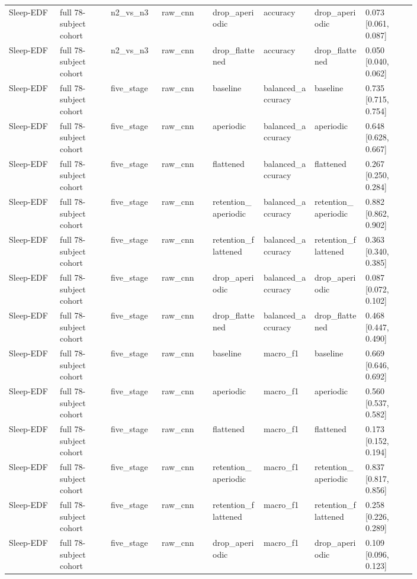 \begin{longtable}{p{0.10\linewidth}p{0.10\linewidth}p{0.10\linewidth}p{0.10\linewidth}p{0.10\linewidth}p{0.10\linewidth}p{0.10\linewidth}p{0.10\linewidth}}
Sleep-EDF & full 78-subject cohort & n2\_vs\_n3 & raw\_cnn & drop\_aperiodic & accuracy & drop\_aperiodic & 0.073 [0.061, 0.087]\\
Sleep-EDF & full 78-subject cohort & n2\_vs\_n3 & raw\_cnn & drop\_flattened & accuracy & drop\_flattened & 0.050 [0.040, 0.062]\\
Sleep-EDF & full 78-subject cohort & five\_stage & raw\_cnn & baseline & balanced\_accuracy & baseline & 0.735 [0.715, 0.754]\\
Sleep-EDF & full 78-subject cohort & five\_stage & raw\_cnn & aperiodic & balanced\_accuracy & aperiodic & 0.648 [0.628, 0.667]\\
Sleep-EDF & full 78-subject cohort & five\_stage & raw\_cnn & flattened & balanced\_accuracy & flattened & 0.267 [0.250, 0.284]\\
Sleep-EDF & full 78-subject cohort & five\_stage & raw\_cnn & retention\_aperiodic & balanced\_accuracy & retention\_aperiodic & 0.882 [0.862, 0.902]\\
Sleep-EDF & full 78-subject cohort & five\_stage & raw\_cnn & retention\_flattened & balanced\_accuracy & retention\_flattened & 0.363 [0.340, 0.385]\\
Sleep-EDF & full 78-subject cohort & five\_stage & raw\_cnn & drop\_aperiodic & balanced\_accuracy & drop\_aperiodic & 0.087 [0.072, 0.102]\\
Sleep-EDF & full 78-subject cohort & five\_stage & raw\_cnn & drop\_flattened & balanced\_accuracy & drop\_flattened & 0.468 [0.447, 0.490]\\
Sleep-EDF & full 78-subject cohort & five\_stage & raw\_cnn & baseline & macro\_f1 & baseline & 0.669 [0.646, 0.692]\\
Sleep-EDF & full 78-subject cohort & five\_stage & raw\_cnn & aperiodic & macro\_f1 & aperiodic & 0.560 [0.537, 0.582]\\
Sleep-EDF & full 78-subject cohort & five\_stage & raw\_cnn & flattened & macro\_f1 & flattened & 0.173 [0.152, 0.194]\\
Sleep-EDF & full 78-subject cohort & five\_stage & raw\_cnn & retention\_aperiodic & macro\_f1 & retention\_aperiodic & 0.837 [0.817, 0.856]\\
Sleep-EDF & full 78-subject cohort & five\_stage & raw\_cnn & retention\_flattened & macro\_f1 & retention\_flattened & 0.258 [0.226, 0.289]\\
Sleep-EDF & full 78-subject cohort & five\_stage & raw\_cnn & drop\_aperiodic & macro\_f1 & drop\_aperiodic & 0.109 [0.096, 0.123]\\

\end{longtable}
